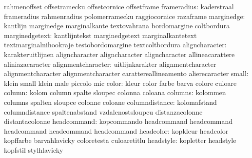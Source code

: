                            rahmenoffset              offsetramecku
                           offsetcornice             offsetframe
              frameradius: kaderstraal               frameradius
                           rahmenradius              polomerramecku
                           raggiocornice             razaframe
               marginedge: kantlijn                  marginedge
                           marginalkante             textovahrana
                           bordomargine              coltbordura
           marginedgetext: kantlijntekst             marginedgetext
                           marginalkantetext         textmarginalnihookraje
                           testobordomargine         textcoltbordura
           aligncharacter: karakteruitlijnen         aligncharacter
                           aligncharacter            aligncharacter
                           allineacarattere          aliniazacaracter %
       alignmentcharacter: uitlijnkarakter           alignmentcharacter
                           alignmentcharacter        alignmentcharacter
                           carattereallineamento     alierecaracter %
                    small: klein                     small
                           klein                     male
                           piccolo                   mic
                    color: kleur                     color
                           farbe                     barva
                           colore                    culoare
                   column: kolom                     column
                           spalte                    sloupec
                           colonna                   coloana
                  columns: kolommen                  columns
                           spalten                   sloupce
                           colonne                   coloane
           columndistance: kolomafstand              columndistance
                           spaltenabstand            vzdalenostsloupcu
                           distanzacolonne           distantacoloane
              headcommand: kopcommando               headcommand
                           headcommand               headcommand
                           headcommand               headcommand
                headcolor: kopkleur                  headcolor
                           kopffarbe                 barvahlavicky
                           coloretesta               culoaretitlu
                headstyle: kopletter                 headstyle
                           kopfstil                  stylhlavicky
